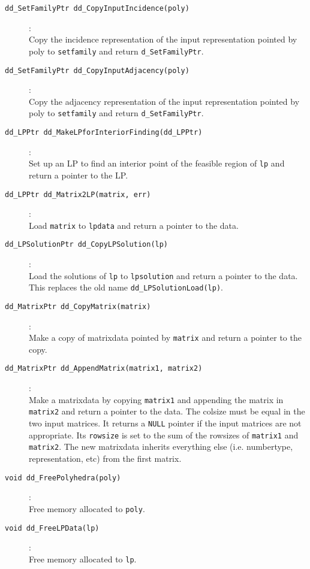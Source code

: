 \documentclass[11pt]{article}
\newcommand {\0} {{\bf 0}}
\begin{document}
\begin{description}
\item[{\tt dd\_SetFamilyPtr dd\_CopyInputIncidence(poly)}]:\\ 
Copy the incidence representation of the input representation
pointed by poly to {\tt setfamily}
and return {\tt d\_SetFamilyPtr}.

\item[{\tt dd\_SetFamilyPtr dd\_CopyInputAdjacency(poly)}]:\\ 
Copy the adjacency representation of the input representation
pointed by poly to {\tt setfamily}
and return {\tt d\_SetFamilyPtr}.

\item[{\tt dd\_LPPtr dd\_MakeLPforInteriorFinding(dd\_LPPtr)}]:\\
Set up an LP to find an interior point of the feasible region of {\tt lp}
and return a pointer to the LP.

\item[{\tt dd\_LPPtr dd\_Matrix2LP(matrix, err)}]:\\
Load {\tt matrix} to {\tt lpdata} and return a pointer to the data.

\item[{\tt dd\_LPSolutionPtr dd\_CopyLPSolution(lp)}]:\\
Load the solutions of {\tt lp} to {\tt lpsolution} and
return a pointer to the data.  This replaces the old name
{\tt dd\_LPSolutionLoad(lp)}.

\item[{\tt dd\_MatrixPtr dd\_CopyMatrix(matrix)}]:\\
Make a copy of matrixdata pointed by {\tt matrix} and return
a pointer to the copy.

\item[{\tt dd\_MatrixPtr dd\_AppendMatrix(matrix1, matrix2)}]:\\
Make a matrixdata by copying {\tt *matrix1} and appending
the matrix in {\tt *matrix2} and return
a pointer to the data.  The colsize must be equal in
the two input matrices.  It returns a {\tt NULL} pointer
if the input matrices are not appropriate.
Its {\tt rowsize} is set to
the sum of the rowsizes of {\tt matrix1} and {\tt matrix2}.
 The new matrixdata inherits everything else
(i.e. numbertype, representation, etc)
from the first matrix. 

\item[{\tt void dd\_FreePolyhedra(poly)}]:\\
Free memory allocated to {\tt poly}.

\item[{\tt void dd\_FreeLPData(lp)}]:\\
Free memory allocated to {\tt lp}.


\end{description}
\end{document}

